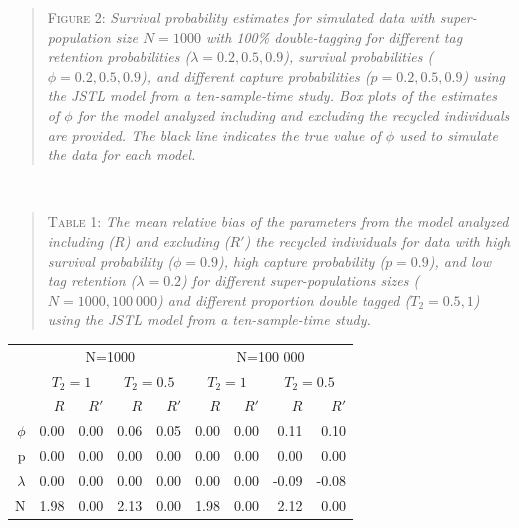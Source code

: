 \documentclass[12pt]{article}
\begin{document}
\begin{quote}
\textsc{Figure 2:}
\textsl{Survival probability estimates for simulated data with super-population size $N=1000$ with 100\% double-tagging for different tag retention probabilities ($\lambda=0.2,0.5,0.9$), survival probabilities ($\phi=0.2,0.5,0.9$), and different capture probabilities ($p=0.2,0.5,0.9$) using the JSTL model from a ten-sample-time study. Box plots of the estimates of $\phi$ for the model analyzed including and excluding the recycled individuals are provided. The black line indicates the true value of $\phi$ used to simulate the data for each model.}
\end{quote}

~ ~

\begin{quote}
\textsc{Table 1:}
\textsl{The mean relative bias of the parameters from the model analyzed including ($R$) and excluding ($R'$) the recycled individuals for data with high survival probability ($\phi=0.9$), high capture probability ($p=0.9$), and low tag retention ($\lambda=0.2$)  for different super-populations sizes ($N=1000,100\ 000$) and different proportion double tagged ($T_2=0.5,1$) using the JSTL model from a ten-sample-time study. }
\end{quote}

\begin{table}[ht]
\centering
\begin{tabular}{rrrrrrrrr}
  \hline

  & \multicolumn{4}{c}{N=1000} & \multicolumn{4}{c}{N=100 000} \\

 &\multicolumn{2}{c}{$T_2=1$}  &\multicolumn{2}{c}{$T_2=0.5$} &\multicolumn{2}{c}{$T_2=1$} &\multicolumn{2}{c}{$T_2=0.5$}\\ 

&$R$   &$R'$   &$R$   &$R'$   &$R$   &$R'$   &$R$   &$R'$\\ 
  \hline
$\phi$ & 0.00 & 0.00 & 0.06 & 0.05 & 0.00 & 0.00 & 0.11 & 0.10 \\ 
  p & 0.00 & 0.00 & 0.00 & 0.00 & 0.00 & 0.00 & 0.00 & 0.00 \\ 
  $\lambda$ & 0.00 & 0.00 & 0.00 & 0.00 & 0.00 & 0.00 & -0.09 & -0.08 \\ 
  N & 1.98 & 0.00 & 2.13 & 0.00 & 1.98 & 0.00 & 2.12 & 0.00 \\ 
   \hline
\end{tabular}
\end{table}
\end{document}
